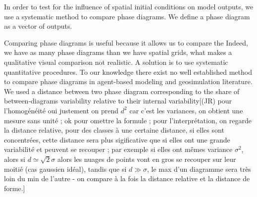 \documentclass[Royal,sageh,times]{sagej}
\begin{document}
In order to test for the influence of spatial initial conditions on model outputs, we use a systematic method to compare phase diagrams. We define a phase diagram as a vector of  outputs. 

Comparing phase diagrams is useful because it allows us to compare the 
Indeed, we have as many phase diagrams than we have spatial grids, what makes a qualitative visual comparison not realistic. A solution is to use systematic quantitative procedures. To our knowledge there exist no well established method to compare phase diagrams in agent-based modeling and geosimulation literature. We used a distance between two phase diagram corresponding to the share of between-diagrams variability relative to their internal variability[(JR) pour l'homogénéité oui justement on prend $d^2$ car c'est les variances, on obtient une mesure sans unité ; ok pour omettre la formule ; pour l'interprétation, on regarde la distance relative, pour des classes à une certaine distance, si elles sont concentrées, cette distance sera plus sigificative que si elles ont une grande variabilité et peuvent se recouper ; par exemple si elles ont mêmes variance $\sigma^2$, alors si $d \simeq \sqrt{2} \sigma$ alors les nuages de points vont en gros se recouper sur leur moitié (cas gaussien idéal), tandis que si $d\gg \sigma$, le max d'un diagramme sera très loin du min de l'autre - on compare à la fois la distance relative et la distance de forme.]

\end{document}
